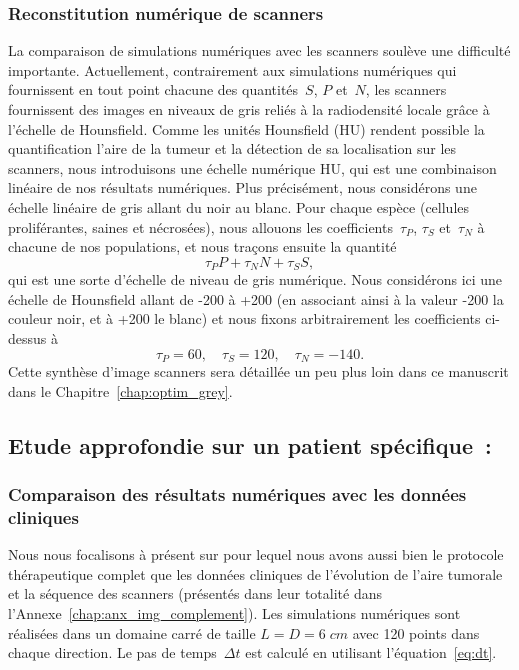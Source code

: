 \documentclass[main.tex]{subfiles}
\begin{document}
\subsubsection{Reconstitution numérique de scanners}

La comparaison de simulations numériques 
avec les scanners soulève une difficulté importante. 
Actuellement, contrairement aux simulations numériques qui fournissent en tout point chacune des quantités~$S$, $P$ et~$N$, les scanners fournissent des images en niveaux de gris reliés à la radiodensité locale grâce à l'échelle de 
Hounsfield. Comme les unités Hounsfield (HU) rendent possible la quantification  
l'aire de la tumeur et la détection de sa localisation sur les scanners, nous introduisons une échelle numérique HU, qui est une combinaison linéaire de nos résultats numériques. 
Plus précisément, nous considérons une échelle linéaire de gris allant du noir au blanc. Pour chaque espèce (cellules proliférantes, saines et nécrosées), nous allouons les 
coefficients~$\tau_P$, $\tau_S$ et~$\tau_N$ à chacune de nos populations, et nous traçons ensuite la quantité
\begin{equation}\label{eq:grey_level}
\tau_P P + \tau_N N + \tau_S S,
\end{equation}
qui est une sorte d'échelle de niveau de gris numérique. 
Nous considérons ici une échelle de Hounsfield allant de 
-200 à +200 (en associant ainsi à la valeur -200 la couleur noir, et à +200 le blanc) et nous fixons arbitrairement les coefficients ci-dessus à 
\begin{equation}\label{eq:tau_arbitraire}
\tau_P=60,\quad \tau_S=120,\quad \tau_N=-140.
\end{equation}
Cette synthèse d'image scanners sera détaillée un peu plus loin dans ce manuscrit dans le Chapitre~\ref{chap:optim_grey}.


\subsection{Etude approfondie sur un patient spécifique~: \Nber}
\subsubsection{Comparaison des résultats numériques avec les données cliniques}
Nous nous focalisons à présent sur \Nber pour lequel nous avons aussi bien le protocole thérapeutique complet que les données cliniques de l'évolution de l'aire tumorale et la séquence des scanners (présentés dans leur totalité dans l'Annexe~\ref{chap:anx_img_complement}). 
Les simulations numériques sont réalisées dans un domaine carré de taille 
$L=D=6\;cm$ avec 120 points dans chaque direction. 
Le pas de temps~$\Delta t$ est calculé en utilisant l'équation~\eqref{eq:dt}. 
\end{document}
